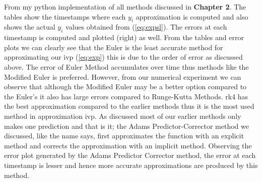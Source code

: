 \documentclass[12pt,oneside]{book}
\begin{document}
	From my python implementation of all methods discussed in \textbf{Chapter 2}. The tables show the timestamps where each $ y_{i} $ approximation is computed and also shows the actual $ y_{i} $ values obtained from (\ref{eq:expsl}). The errors at each timestamp is computed and plotted (right) as well. From the tables and error plots we can clearly see that the Euler is the least accurate method for approximating our \ac{ivp} (\ref{eq:exp}) this is due to the order of error as discussed above. The error of Euler Method accumulates over time thus methods like the Modified Euler is preferred. However, from our numerical experiment we can observe that although the Modified Euler may be a better option compared to the Euler's it also has large errors compared to Runge-Kutta Methods. \ac{rk4} has the best approximation compared to the earlier methods thus it is the most used method in approximation \ac{ivp}. \newline
	As discussed most of our earlier methods only makes one prediction and that is it; the Adams Predictor-Corrector method we discussed, like the name says, first approximates the function with an explicit method and corrects the approximation with an implicit method. Observing the error plot generated by the Adams Predictor Corrector method, the error at each timestamp is lesser and hence more accurate approximations are produced by this method.
	

	\backmatter
	
	\renewcommand{\bibname}{REFERENCES}
	
	
\end{document}
